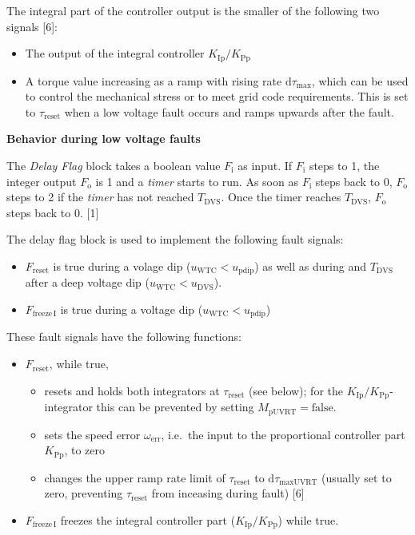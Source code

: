 \documentclass[
  a4paper,
  DIV=11,
  numbers=noendperiod]{scrartcl}
\providecommand{\tightlist}{%
  \setlength{\itemsep}{0pt}\setlength{\parskip}{0pt}}\usepackage{longtable,booktabs,array}
\begin{document}
The integral part of the controller output is the smaller of the
following two signals {[}6{]}:

\begin{itemize}
\tightlist
\item
  The output of the integral controller \(K_\mathrm{Ip}/K_\mathrm{Pp}\)
\item
  A torque value increasing as a ramp with rising rate
  \(\mathrm{d}\tau_\mathrm{max}\), which can be used to control the
  mechanical stress or to meet grid code requirements. This is set to
  \(\tau_\mathrm{reset}\) when a low voltage fault occurs and ramps
  upwards after the fault.
\end{itemize}

\textbf{Behavior during low voltage faults}

The \emph{Delay Flag} block takes a boolean value \(F_\mathrm{i}\) as
input. If \(F_\mathrm{i}\) steps to 1, the integer output
\(F_\mathrm{o}\) is 1 and a \emph{timer} starts to run. As soon as
\(F_\mathrm{i}\) steps back to 0, \(F_\mathrm{o}\) steps to 2 if the
\emph{timer} has not reached \(T_\mathrm{DVS}\). Once the timer reaches
\(T_\mathrm{DVS}\), \(F_\mathrm{o}\) steps back to 0. {[}1{]}

The delay flag block is used to implement the following fault signals:

\begin{itemize}
\tightlist
\item
  \(F_\mathrm{reset}\) is true during a volage dip
  (\(u_\mathrm{WTC} < u_\mathrm{pdip}\)) as well as during and
  \(T_\mathrm{DVS}\) after a deep voltage dip
  (\(u_\mathrm{WTC} < u_\mathrm{DVS}\)).
\item
  \(F_\mathrm{freeze\,I}\) is true during a voltage dip
  (\(u_\mathrm{WTC} < u_\mathrm{pdip}\))
\end{itemize}

These fault signals have the following functions:

\begin{itemize}
\tightlist
\item
  \(F_\mathrm{reset}\), while true,

  \begin{itemize}
  \tightlist
  \item
    resets and holds both integrators at \(\tau_\mathrm{reset}\) (see
    below); for the \(K_\mathrm{Ip}/K_\mathrm{Pp}\)-integrator this can
    be prevented by setting \(M_\mathrm{pUVRT} = \mathrm{false}\).
  \item
    sets the speed error \(\omega_\mathrm{err}\), i.e.~the input to the
    proportional controller part \(K_\mathrm{Pp}\), to zero
  \item
    changes the upper ramp rate limit of \(\tau_\mathrm{reset}\) to
    \(\mathrm{d}\tau_\mathrm{maxUVRT}\) (usually set to zero, preventing
    \(\tau_\mathrm{reset}\) from inceasing during fault) {[}6{]}
  \end{itemize}
\item
  \(F_\mathrm{freeze\,I}\) freezes the integral controller part
  (\(K_\mathrm{Ip}/K_\mathrm{Pp}\)) while true.
\end{itemize}
\end{document}

